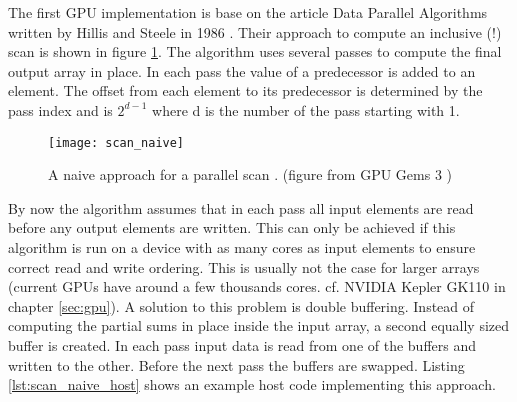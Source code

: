 The first GPU implementation is base on the article Data Parallel Algorithms written by Hillis and Steele in 1986 \cite{scan_naive}. Their approach to compute an inclusive (!) scan is shown in figure \ref{fig:scan_naive}. The algorithm uses several passes to compute the final output array in place. In each pass the value of a predecessor is added to an element. The offset from each element to its predecessor is determined by the pass index and is $2^{d - 1}$ where d is the number of the pass starting with 1.

\begin{figure}
\centering
\texttt{[image: scan\_naive]}
\caption{A naive approach for a parallel scan \cite{scan_naive}. (figure from GPU Gems 3 \cite{gpu_gems_3_chapter_39})}
\label{fig:scan_naive}
\end{figure}

By now the algorithm assumes that in each pass all input elements are read before any output elements are written. This can only be achieved if this algorithm is run on a device with as many cores as input elements to ensure correct read and write ordering. This is usually not the case for larger arrays (current GPUs have around a few thousands cores. cf. NVIDIA Kepler GK110 in chapter \ref{sec:gpu}). A solution to this problem is double buffering. Instead of computing the partial sums in place inside the input array, a second equally sized buffer is created. In each pass input data is read from one of the buffers and written to the other. Before the next pass the buffers are swapped.
Listing \ref{lst:scan_naive_host} shows an example host code implementing this approach.



